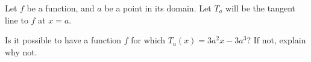 \documentclass{ximera}
\author{Steven Gubkin}
\begin{document}
\begin{exercise}


Let $f$ be a function, and $a$ be a point in its domain. Let $T_a$ will be the tangent line to $f$ at $x=a$.

Is it possible to have a function $f$ for which $T_a(x) = 3a^2x-3a^3$? If not, explain why not.  

\end{exercise}
\end{document}
